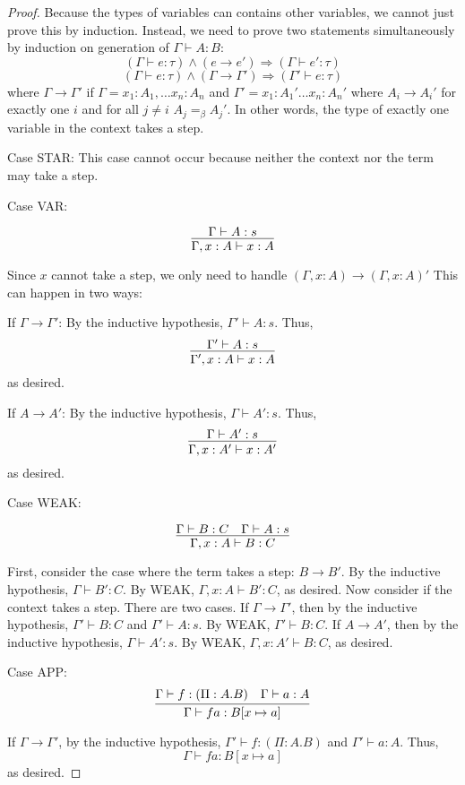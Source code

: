\documentclass{article}
\begin{document}
\begin{proof}
  Because the types of variables can contains other variables, we cannot just prove this by induction. Instead, we need to prove two statements simultaneously by induction on generation of $\Gamma\vdash A:B$:
  \[(\Gamma\vdash e:\tau)\wedge(e\rightarrow e')\Rightarrow(\Gamma\vdash e':\tau)\]
  \[(\Gamma\vdash e:\tau)\wedge(\Gamma\rightarrow \Gamma')\Rightarrow(\Gamma'\vdash e:\tau)\]
  where $\Gamma\rightarrow\Gamma'$ if $\Gamma=x_1:A_1,\ldots x_n:A_n$ and $\Gamma'=x_1:A_1'\ldots x_n:A_n'$ where $A_i\rightarrow A_i'$ for exactly one $i$ and for all $j\ne i$ $A_j=_\beta A_j'$. In other words, the type of exactly one variable in the context takes a step.

  Case STAR: This case cannot occur because neither the context nor the term may take a step.

  Case VAR:
  
  \[\infer{\Gamma,x:A\vdash x:A}{\Gamma\vdash A:s}\]

  Since $x$ cannot take a step, we only need to handle $(\Gamma,x:A)\rightarrow(\Gamma,x:A)'$
  This can happen in two ways:
  
  If $\Gamma\rightarrow\Gamma'$: By the inductive hypothesis, $\Gamma'\vdash A:s$. Thus,
  \[\infer{\Gamma',x:A\vdash x:A}{\Gamma'\vdash A:s}\]
  as desired.
  
  If $A \rightarrow A'$: By the inductive hypothesis, $\Gamma\vdash A':s$. Thus,
  \[\infer{\Gamma,x:A'\vdash x:A'}{\Gamma\vdash A':s}\]
  as desired.
  
  Case WEAK:

  \[\infer{\Gamma,x:A\vdash B:C}{\Gamma\vdash B:C & \Gamma\vdash A:s}\]

  First, consider the case where the term takes a step: $B\rightarrow B'$.
  By the inductive hypothesis, $\Gamma\vdash B':C$. By WEAK, $\Gamma,x:A\vdash B':C$, as desired.
  Now consider if the context takes a step. There are two cases. If $\Gamma\rightarrow\Gamma'$, then by the inductive hypothesis, $\Gamma'\vdash B:C$ and $\Gamma'\vdash A:s$. By WEAK, $\Gamma'\vdash B:C$.
  If $A\rightarrow A'$, then by the inductive hypothesis, $\Gamma\vdash A':s$. By WEAK, $\Gamma,x:A'\vdash B:C$, as desired.
  
  Case APP:
  \[\infer{\Gamma\vdash f a:B[x\mapsto a]}{\Gamma\vdash f:(\Pi:A.B) & \Gamma\vdash a:A}\]

  If $\Gamma\rightarrow \Gamma'$, by the inductive hypothesis, $\Gamma'\vdash f:(\Pi:A.B)$ and $\Gamma'\vdash a:A$. Thus,
  \[\Gamma\vdash f a:B[x\mapsto a]\]
  as desired.


\end{proof}
\end{document}
